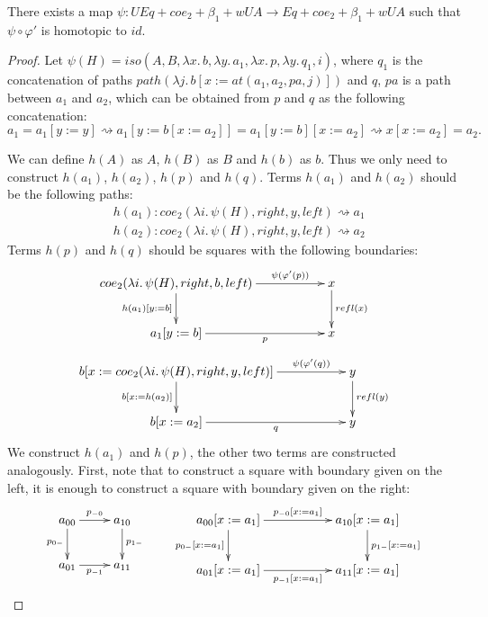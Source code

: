 \documentclass[reqno]{amsart}
\theoremstyle{definition}
\theoremstyle{remark}
\newcommand{\repl}{:=}
\newcommand{\idtype}{\rightsquigarrow}
\numberwithin{figure}{section}
\begin{document}
\begin{lem}[UA]
There exists a map $\psi : UEq + coe_2 + \beta_1 + wUA \to Eq + coe_2 + \beta_1 + wUA$ such that $\psi \circ \varphi'$ is homotopic to $id$.
\end{lem}
\begin{proof}
Let $\psi(H) = iso(A, B, \lambda x.\,b, \lambda y.\,a_1, \lambda x.\,p, \lambda y.\,q_1, i)$, where
$q_1$ is the concatenation of paths $path(\lambda j.\,b[x \repl at(a_1, a_2, pa,j)])$ and $q$,
$pa$ is a path between $a_1$ and $a_2$, which can be obtained from $p$ and $q$ as the following concatenation:
\[ a_1 = a_1[y \repl y] \idtype a_1[y \repl b[x \repl a_2]] = a_1[y \repl b][x \repl a_2] \idtype x[x \repl a_2] = a_2. \]

We can define $h(A)$ as $A$, $h(B)$ as $B$ and $h(b)$ as $b$.
Thus we only need to construct $h(a_1)$, $h(a_2)$, $h(p)$ and $h(q)$.
Terms $h(a_1)$ and $h(a_2)$ should be the following paths:
\begin{align*}
& h(a_1) : coe_2(\lambda i.\,\psi(H), right, y, left) \idtype a_1 \\
& h(a_2) : coe_2(\lambda i.\,\psi(H), right, y, left) \idtype a_2
\end{align*}
Terms $h(p)$ and $h(q)$ should be squares with the following boundaries:
\[ \xymatrix{ coe_2(\lambda i.\,\psi(H), right, b, left) \ar[rr]^-{\psi(\varphi'(p))} \ar[d]_{h(a_1)[y \repl b]} & & x \ar[d]^{refl(x)} \\
              a_1[y \repl b] \ar[rr]_-p                                                                          & & x
            } \]
\[ \xymatrix{ b[x \repl coe_2(\lambda i.\,\psi(H), right, y, left)] \ar[rr]^-{\psi(\varphi'(q))} \ar[d]_{b[x \repl h(a_2)]} & & y \ar[d]^{refl(y)} \\
              b[x \repl a_2] \ar[rr]_-q                                                                                     & & y
            } \]
We construct $h(a_1)$ and $h(p)$, the other two terms are constructed analogously.
First, note that to construct a square with boundary given on the left, it is enough to construct a square with boundary given on the right:
\[ \xymatrix{ a_{00} \ar[r]^{p_{-0}} \ar[d]_{p_{0-}} & a_{10} \ar[d]^{p_{1-}} \\
              a_{01} \ar[r]_{p_{-1}}                 & a_{11}
            }
\qquad
   \xymatrix{ a_{00}[x \repl a_1] \ar[rr]^{p_{-0}[x \repl a_1]} \ar[d]_{p_{0-}[x \repl a_1]} & & a_{10}[x \repl a_1] \ar[d]^{p_{1-}[x \repl a_1]} \\
              a_{01}[x \repl a_1] \ar[rr]_{p_{-1}[x \repl a_1]}                              & & a_{11}[x \repl a_1]
}\]
\end{proof}
\end{document}
